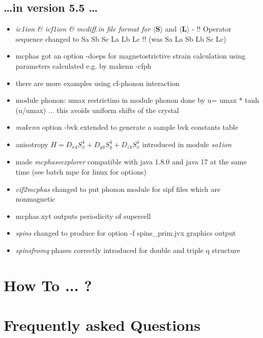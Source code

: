 \documentclass[twoside]{article}
\newcommand{\mbf}[1]{\mathbf #1}
\newcommand{\prg}{\sl}
\begin{document}
\subsection*{ \dots in version 5.5 \dots}
\begin{itemize}
\item {\prg ic1ion \& icf1ion \& mcdiff.in file format for} $\langle \mbf S \rangle$
and  $\langle \mbf L \rangle$ - !!  Operator sequence changed to Sa Sb Sc La Lb Lc !! 
(was Sa La Sb Lb Sc Lc)
\item   mcphas got an option -doeps for magnetostrictive strain calculation using parameters
calculated e.g. by makenn -cfph 
\item  there are more examples using cf-phonon interaction
\item module phonon: umax restrictino in module phonon done by 
u= umax * tanh (u/umax) ... this avoids uniform shifts of the crystal 
\item {\prg makenn} option -bvk extended to generate a sample bvk constants table 
\item anisotropy $H=D_{x4} S_x^4 +D_{y4} S_y^4 +D_{z4} S_x^4$ introduced in module {\prg so1ion}
\item made {\prg mcphaseexplorer} compatible with java 1.8.0 and java 17 at the 
           same time (see batch mpe for linux for options) 
\item {\prg cif2mcphas} changed to put phonon module for sipf files which are nonmagnetic
\item  mcphas.xyt outputs periodicity of supercell
\item {\prg spins} changed to produce for option -f spins\_prim.jvx graphics output
\item  {\prg spinsfromq} phases correctly introduced for double and triple q structure
\end{itemize}


\newpage

\tableofcontents

\clearpage

\section{How To ... ? }


\section{Frequently asked Questions}

\end{document}
